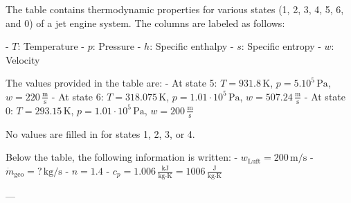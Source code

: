The table contains thermodynamic properties for various states (1, 2, 3, 4, 5, 6, and 0) of a jet engine system. The columns are labeled as follows:  

- \( T \): Temperature  
- \( p \): Pressure  
- \( h \): Specific enthalpy  
- \( s \): Specific entropy  
- \( w \): Velocity  

The values provided in the table are:  
- At state 5:  
  \( T = 931.8 \, \text{K} \), \( p = 5.10^5 \, \text{Pa} \), \( w = 220 \, \frac{\text{m}}{\text{s}} \)  
- At state 6:  
  \( T = 318.075 \, \text{K} \), \( p = 1.01 \cdot 10^5 \, \text{Pa} \), \( w = 507.24 \, \frac{\text{m}}{\text{s}} \)  
- At state 0:  
  \( T = 293.15 \, \text{K} \), \( p = 1.01 \cdot 10^5 \, \text{Pa} \), \( w = 200 \, \frac{\text{m}}{\text{s}} \)  

No values are filled in for states 1, 2, 3, or 4.  

Below the table, the following information is written:  
- \( w_{\text{Luft}} = 200 \, \text{m/s} \)  
- \( \dot{m}_{\text{geo}} = ? \, \text{kg/s} \)  
- \( n = 1.4 \)  
- \( c_p = 1.006 \, \frac{\text{kJ}}{\text{kg·K}} = 1006 \, \frac{\text{J}}{\text{kg·K}} \)  

---
